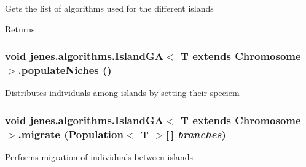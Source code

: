 Gets the list of algorithms used for the different islands

\begin{Desc}
\item[Returns:]\end{Desc}
\hypertarget{classjenes_1_1algorithms_1_1_island_g_a_3_01_t_01extends_01_chromosome_01_4_fdd01d6051280db25af39a8382a48239}{
\subsubsection[populateNiches]{\setlength{\rightskip}{0pt plus 5cm}void jenes.algorithms.IslandGA$<$ T extends Chromosome $>$.populateNiches ()}}
\label{classjenes_1_1algorithms_1_1_island_g_a_3_01_t_01extends_01_chromosome_01_4_fdd01d6051280db25af39a8382a48239}


Distributes individuals among islands by setting their speciem \hypertarget{classjenes_1_1algorithms_1_1_island_g_a_3_01_t_01extends_01_chromosome_01_4_73312f19002cfeb0daf1f66e4eeccbd9}{
\subsubsection[migrate]{\setlength{\rightskip}{0pt plus 5cm}void jenes.algorithms.IslandGA$<$ T extends Chromosome $>$.migrate (Population$<$ T $>$\mbox{[}$\,$\mbox{]} {\em branches})}}
\label{classjenes_1_1algorithms_1_1_island_g_a_3_01_t_01extends_01_chromosome_01_4_73312f19002cfeb0daf1f66e4eeccbd9}


Performs migration of individuals between islands

